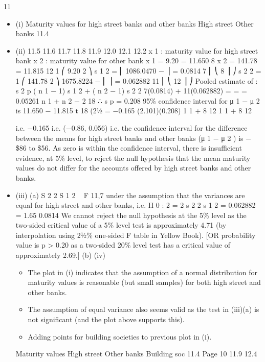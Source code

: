 \documentclass[a4paper,12pt]{article}
\begin{document}
\begin{enumerate}
\newpage
11
\begin{itemize}
\item (i)
Maturity values for high street banks and other banks
High street
Other banks
11.4
\item (ii)
11.5
11.6
11.7
11.8
11.9
12.0
12.1
12.2
x 1 : maturity value for high street bank
x 2 : maturity value for other bank
x 1 = 9.20
= 11.650
8
x 2 = 141.78
= 11.815
12
1 ⎛
9.20 2 ⎞
s 1 2 = ⎜ 1086.0470 −
⎟ = 0.0814
7 ⎜ ⎝
8 ⎟ ⎠
s 2 2 =
1 ⎛
141.78 2 ⎞
1675.8224
−
⎜
⎟ = 0.062882
11 ⎜ ⎝
12 ⎟ ⎠
Pooled estimate of \sigma:
s 2 p
( n 1 − 1) s 1 2 + ( n 2 − 1) s 2 2 7(0.0814) + 11(0.062882)
=
=
= 0.05261
n 1 + n 2 − 2
18
∴ s p = 0.208
95\% confidence interval for μ 1 − μ 2 is
11.650 − 11.815 \pm t 18 (21⁄2%
= −0.165 \pm (2.101)(0.208)
1 1
+
8 12
1 1
+
8 12

i.e. −0.165 
i.e. (−0.86, 0.056)
i.e. the confidence interval for the difference between the means for high street banks and other banks (μ 1 − μ 2 ) is −\$86 to \$56.
As zero is within the confidence interval, there is insufficient evidence, at 5\% level, to reject the null hypothesis that the mean maturity values do not differ
for the accounts offered by high street banks and other banks.
\item (iii)
(a)
S 2 2
S 1 2
~ F 11,7
under the assumption that the variances are equal for high street and
other banks,
i.e. H 0 :  2 =  2
s 2 2
s 1 2
=
0.062882
= 1.65
0.0814
We cannot reject the null hypothesis at the 5\% level as the two-sided critical value of a 5\% level test is approximately 4.71 (by interpolation using 21⁄2\% one-sided F table in Yellow Book).
[OR probability value is p > 0.20 as a two-sided 20\% level test has a critical value of approximately 2.69.]
(b)
(iv)
\begin{itemize}
\item The plot in (i) indicates that the assumption of a normal distribution for maturity values is reasonable (but small samples) for both high street
and other banks. 
\item The assumption of equal variance also seems valid as the test in (iii)(a) is not significant (and the plot above supports this).
\item Adding points for building societies to previous plot in (i).
\end{itemize}
Maturity values
High street
Other banks
Building soc
11.4
Page 10
11.9
12.4


\end{itemize}
\end{enumerate}
\end{document}
